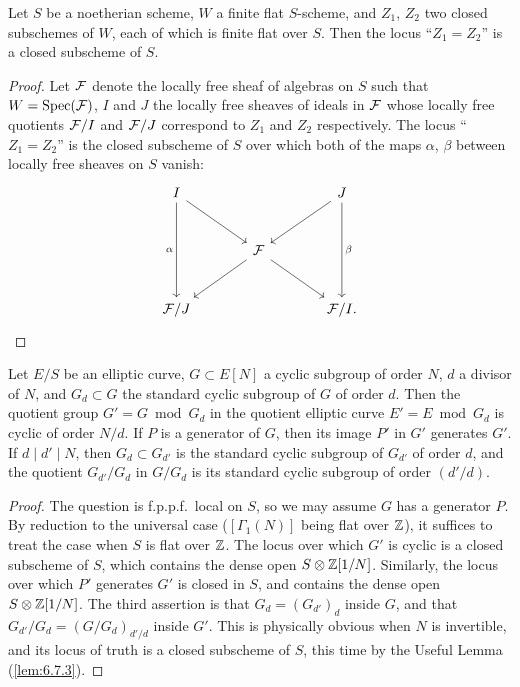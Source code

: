 \begin{kusefullem}\label{lem:6.7.3}
Let $S$ be a noetherian scheme, $W$ a finite flat $S$-scheme, and $Z_1$, $Z_2$ two closed subschemes of $W$, each of which is finite flat over $S$. Then the locus ``$Z_1 = Z_2$'' is a closed subscheme of $S$.
\end{kusefullem}

\begin{proof}
Let $\mathcal{F}$ denote the locally free sheaf of algebras on $S$ such that $W = \operatorname{Spec}(\mathcal{F})$, $I$ and $J$ the locally free sheaves of ideals in $\mathcal{F}$ whose locally free quotients $\mathcal{F}/I$ and $\mathcal{F}/J$ correspond to $Z_1$ and $Z_2$ respectively. The locus ``$Z_1 = Z_2$'' is the closed subscheme of $S$ over which both of the maps $\alpha$, $\beta$ between locally free sheaves on $S$ vanish:
\[
\begin{tikzcd}[column sep=large, row sep=large, every label/.append style={font=\scriptsize}]
I \arrow[dr] \arrow[dd, "\alpha"'] & & J \arrow[dl] \arrow[dd, "\beta"] \\
& \cF \arrow[dl] \arrow[dr] & \\
\cF/J & & \cF/I .
\end{tikzcd}
\qedhere
\]
\end{proof}

\begin{kthm}\label{thm:6.7.4}
Let $E/S$ be an elliptic curve, $G \subset E[N]$ a cyclic subgroup of order $N$, $d$ a divisor of $N$, and $G_d \subset G$ the standard cyclic subgroup of $G$ of order $d$. Then the quotient group $G' = G \bmod G_d$ in the quotient elliptic curve $E' = E \bmod G_d$ is cyclic of order $N/d$. If $P$ is a generator of $G$, then its image $P'$ in $G'$ generates $G'$. If $d \mid d' \mid N$, then $G_d \subset G_{d'}$ is the standard cyclic subgroup of $G_{d'}$ of order $d$, and the quotient $G_{d'}/G_d$ in $G/G_d$ is its standard cyclic subgroup of order $(d'/d)$.
\end{kthm}

\begin{proof}
The question is f.p.p.f.\ local on $S$, so we may assume $G$ has a generator $P$. By reduction to the universal case ($[\Gamma_1(N)]$ being flat over $\mathbb{Z}$), it suffices to treat the case when $S$ is flat over $\mathbb{Z}$. The locus over which $G'$ is cyclic is a closed subscheme of $S$, which contains the dense open $S \otimes \mathbb{Z}[1/N]$. Similarly, the locus over which $P'$ generates $G'$ is closed in $S$, and contains the dense open $S \otimes \mathbb{Z}[1/N]$. The third assertion is that $G_d = (G_{d'})_d$ inside $G$, and that $G_{d'}/G_d = (G/G_d)_{d'/d}$ inside $G'$. This is physically obvious when $N$ is invertible, and its locus of truth is a closed subscheme of $S$, this time by the Useful Lemma (\ref{lem:6.7.3}).
\end{proof}


